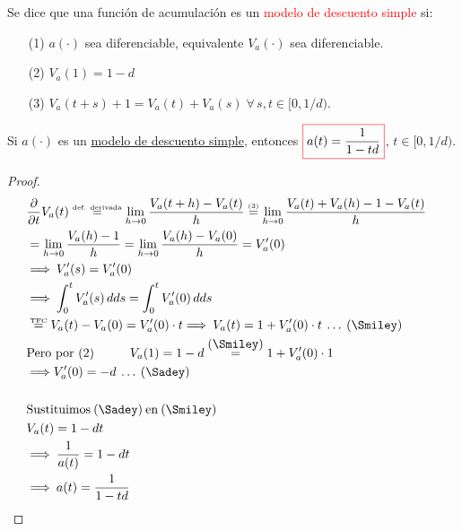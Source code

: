 \begin{definition}
Se dice que una función de acumulación  es un \textcolor{red}{modelo de descuento simple} si:
\begin{enumerate}
\item[(1)] $a(\cdot)$ sea diferenciable, equivalente $V_a(\cdot)$ sea diferenciable.
\item[(2)] $V_a(1) = 1-d$
\item[(3)] $V_a(t+s)+1 = V_a(t) + V_a(s) \; \forall \, s,t \in [0, 1/d)$. 
\end{enumerate}
\end{definition}

\begin{proposition}
Si $a(\cdot)$ es un \uline{modelo de descuento simple}, entonces $\color{red}\boxed{\color{black}a(t) = \frac{1}{1-td}}$, $t\in[0,1/d)$.
\end{proposition}
\begin{proof}
\begin{align*}
&\dpartial{t} V_a(t) \mathrel{\stackon[1pt]{$=$}{$\scriptscriptstyle \text{def. derivada}$}} \lim_{h \to 0} \frac{V_a(t+h) - V_a(t)}{h} \mathrel{\stackon[1pt]{$=$}{$\scriptscriptstyle \text{(3)}$}} \lim_{h \to 0} \frac{V_a(t) + V_a(h) -1 - V_a(t)}{h}\\
& = \lim_{h \to 0} \frac{V_a(h)-1}{h} = \lim_{h \to 0} \frac{V_a(h) - V_a(0)}{h} = V_a'(0)\\
& \Longrightarrow\: V_a'(s) = V'_a(0)\\
& \Longrightarrow\: \integral{0}{t}{V_a'(s)}{ds} = \integral{0}{t}{V_a'(0)}{ds}\\
& \mathrel{\stackon[1pt]{$=$}{$\scriptscriptstyle \text{TFC}$}}       V_a(t) - V_a(0) = V_a'(0)\cdot t \Longrightarrow\: V_a(t) = 1 + V_a'(0)\cdot t \: \ldots \: (\Smiley)\\
&\text{Pero por (2)} \hspace{1cm} V_a(1) = 1-d \mathrel{\stackon[1pt]{$=$}{$(\Smiley)$}} 1 + V_a'(0) \cdot 1\\
&\Longrightarrow V_a'(0) = -d \: \ldots \: (\Sadey)\\
&\hfill&\\
&\text{Sustituimos} \: (\Sadey)\: \text{en} \: (\Smiley)\\
& V_a(t) = 1-dt\\
&\Longrightarrow\: \frac{1}{a(t)} = 1 -dt\\
&\Longrightarrow\: a(t) = \frac{1}{1-td}   
\end{align*}
\end{proof}
